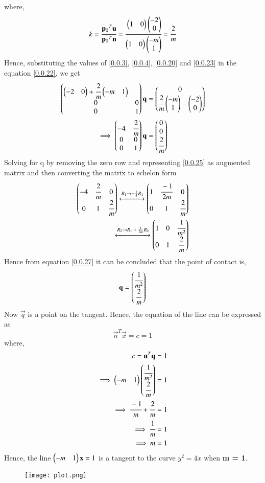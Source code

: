\documentclass[journal,12pt,twocolumn]{IEEEtran}
\begin{document}
where,
\begin{equation}
    k = \cfrac{\mathbf{p_1}^{T}\mathbf{u}}{\mathbf{p_1}^{T}\mathbf{n}} = \cfrac{\begin{pmatrix}1 & 0\end{pmatrix}\begin{pmatrix}-2 \\ 0\end{pmatrix}}{\begin{pmatrix}1 & 0\end{pmatrix}\begin{pmatrix}-m \\ 1\end{pmatrix}} = \cfrac{2}{m} \label{0.0.23}
\end{equation}
Hence, substituting the values of \eqref{0.0.3}, \eqref{0.0.4}, \eqref{0.0.20} and \eqref{0.0.23} in the equation \eqref{0.0.22}, we get
\begin{align}
    \begin{pmatrix}\begin{pmatrix}-2 & 0\end{pmatrix} + \cfrac{2}{m}\begin{pmatrix}-m & 1\end{pmatrix} \\ 0 & 0 \\ 0 & 1\end{pmatrix}\mathbf{q} &= \begin{pmatrix}0 \\ \cfrac{2}{m}\begin{pmatrix}-m \\ 1\end{pmatrix}-\begin{pmatrix}-2\\0\end{pmatrix}\end{pmatrix}\\
    \implies \begin{pmatrix}-4 & \cfrac{2}{m}\\ 0 & 0 \\ 0 & 1\end{pmatrix}\mathbf{q} &= \begin{pmatrix}0 \\ 0 \\ \cfrac{2}{m}\end{pmatrix}\label{0.0.25}
\end{align}
Solving for q by removing the zero row and representing \eqref{0.0.25} as augmented matrix and then converting the matrix to echelon form
\begin{align}
    \begin{pmatrix}-4 & \cfrac{2}{m} & 0 \\ 0 & 1 & \cfrac{2}{m}\end{pmatrix} \xleftrightarrow{\text{$R_1$}\rightarrow{\text{$-\frac{1}{4}R_1$}}} \begin{pmatrix}1 & \cfrac{-1}{2m} & 0 \\ 0 & 1 & \cfrac{2}{m}\end{pmatrix}\\
    \xleftrightarrow{\text{$R_2$}\rightarrow{\text{$R_{1}+\frac{1}{2m}R_2$}}}
    \begin{pmatrix}1 & 0 & \cfrac{1}{m^2} \\ 0 & 1 & \cfrac{2}{m}\end{pmatrix} \label{0.0.27}
\end{align}
Hence from equation \eqref{0.0.27} it can be concluded that the point of contact is,
\begin{equation}
    \mathbf{q} = \begin{pmatrix}\cfrac{1}{m^2} \\ \cfrac{2}{m}\end{pmatrix}
\end{equation}
Now $\vec{q}$ is a point on the tangent. Hence, the equation of the line can be expressed as
\begin{equation}
    \vec{n}^{T}\vec{x} = c = 1
\end{equation}
where,
\begin{align}
    c = \mathbf{n}^{T}\mathbf{q} &= 1\\
    \implies \begin{pmatrix}-m & 1\end{pmatrix}\begin{pmatrix}\cfrac{1}{m^2} \\ \cfrac{2}{m}\end{pmatrix} &= 1\\
    \implies \cfrac{-1}{m} + \cfrac{2}{m} &= 1\\
    \implies \cfrac{1}{m} &= 1\\
    \implies m &= 1
\end{align}
Hence, the line $\begin{pmatrix}-m & 1\end{pmatrix}\mathbf{x} = 1$ is a tangent to the curve $y^2 = 4x$ when \textbf{m = 1}.
\begin{figure}[!ht]
\centering
\texttt{[image: plot.png]}
\end{figure}
\end{document}
